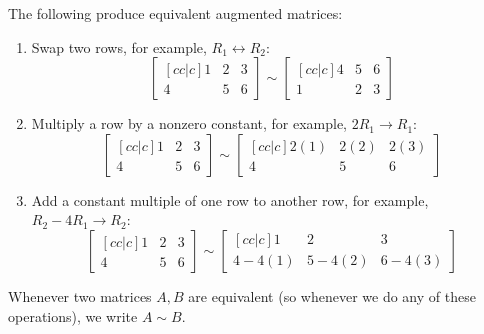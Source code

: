 \begin{definition}
  The following  produce equivalent
  augmented matrices:
  \begin{enumerate}
    \item Swap two rows, for example, \(R_1\leftrightarrow R_2\):
    \[
      \begin{bmatrix}[cc|c] 1 & 2 & 3 \\ 4 & 5 & 6 \end{bmatrix}
    \sim
      \begin{bmatrix}[cc|c] 4 & 5 & 6 \\ 1 & 2 & 3 \end{bmatrix}
    \]
    \item Multiply a row by a nonzero constant, for example, \(2R_1\rightarrow R_1\):
    \[
      \begin{bmatrix}[cc|c] 1 & 2 & 3 \\ 4 & 5 & 6 \end{bmatrix}
    \sim
      \begin{bmatrix}[cc|c] 2(1) & 2(2) & 2(3) \\ 4 & 5 & 6 \end{bmatrix}
    \]
    \item Add a constant multiple of one row to another row,
          for example, \(R_2-4R_1\rightarrow R_2\):
    \[
      \begin{bmatrix}[cc|c] 1 & 2 & 3 \\ 4 & 5 & 6 \end{bmatrix}
    \sim
      \begin{bmatrix}[cc|c] 1 & 2 & 3 \\ 4-4(1) & 5-4(2) & 6-4(3) \end{bmatrix}
    \]
  \end{enumerate}
  Whenever two matrices \(A,B\) are equivalent (so whenever we do any of
  these operations), we write \(A\sim B\).
\end{definition}

